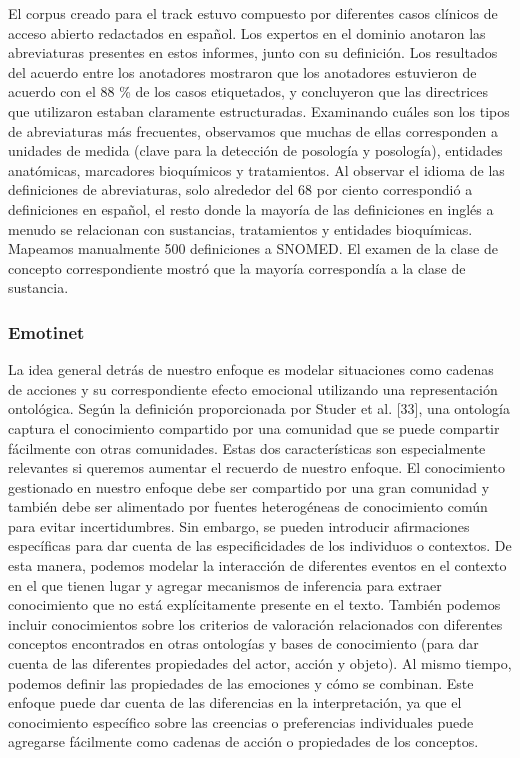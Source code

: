 El corpus creado para el track estuvo compuesto por diferentes casos clínicos de acceso abierto redactados en español. Los expertos en el dominio anotaron las abreviaturas presentes en estos informes, junto con su definición. Los resultados del acuerdo entre los anotadores mostraron que los anotadores estuvieron de acuerdo con el 88 \% de los casos etiquetados, y concluyeron que las directrices que utilizaron estaban claramente estructuradas. Examinando cuáles son los tipos de abreviaturas más frecuentes, observamos que muchas de ellas corresponden a unidades de medida (clave para la detección de posología y posología), entidades anatómicas, marcadores bioquímicos y tratamientos. Al observar el idioma de las definiciones de abreviaturas, solo alrededor del 68 por ciento correspondió a definiciones en español, el resto donde la mayoría de las definiciones en inglés a menudo se relacionan con sustancias, tratamientos y entidades bioquímicas. Mapeamos manualmente 500 definiciones a SNOMED. El examen de la clase de concepto correspondiente mostró que la mayoría correspondía a la clase de sustancia.

\subsubsection*{Emotinet}

La idea general detrás de nuestro enfoque es modelar situaciones como cadenas de acciones y su correspondiente efecto emocional utilizando una representación ontológica. Según la definición proporcionada por Studer et al. [33], una ontología captura el conocimiento compartido por una comunidad que se puede compartir fácilmente con otras comunidades. Estas dos características son especialmente relevantes si queremos aumentar el recuerdo de nuestro enfoque. El conocimiento gestionado en nuestro enfoque debe ser compartido por una gran comunidad y también debe ser alimentado por fuentes heterogéneas de conocimiento común para evitar incertidumbres. Sin embargo, se pueden introducir afirmaciones específicas para dar cuenta de las especificidades de los individuos o contextos. De esta manera, podemos modelar la interacción de diferentes eventos en el contexto en el que tienen lugar y agregar mecanismos de inferencia para extraer conocimiento que no está explícitamente presente en el texto. También podemos incluir conocimientos sobre los criterios de valoración relacionados con diferentes conceptos encontrados en otras ontologías y bases de conocimiento (para dar cuenta de las diferentes propiedades del actor, acción y objeto). Al mismo tiempo, podemos definir las propiedades de las emociones y cómo se combinan. Este enfoque puede dar cuenta de las diferencias en la interpretación, ya que el conocimiento específico sobre las creencias o preferencias individuales puede agregarse fácilmente como cadenas de acción o propiedades de los conceptos.

